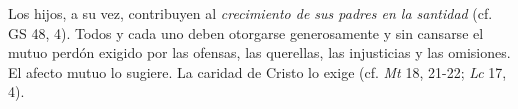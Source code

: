 	 Los hijos, a su vez, contribuyen al \emph{crecimiento de sus padres en la santidad} (cf. GS 48, 4). Todos y cada uno deben otorgarse generosamente y sin cansarse el mutuo perdón exigido por las ofensas, las querellas, las injusticias y las omisiones. El afecto mutuo lo sugiere. La caridad de Cristo lo exige (cf. \emph{Mt} 18, 21-22; \emph{Lc} 17, 4).